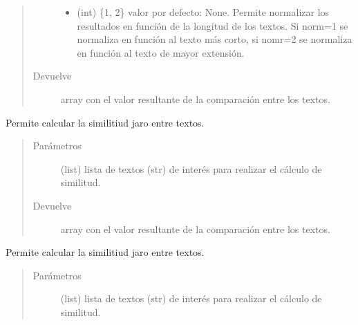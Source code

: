 \documentclass[letterpaper,10pt,openany,spanish]{sphinxmanual}
\begin{document}
\begin{fulllineitems}
\begin{fulllineitems}
\begin{quote}
\begin{description}
\begin{itemize}
\item {} 
 \textendash{} (int) \{1, 2\} valor por defecto: None. Permite normalizar 
los resultados en función de la longitud de los textos. 
Si norm=1 se normaliza en función al texto más corto, 
si nomr=2 se normaliza en función al texto de mayor extensión.

\end{itemize}

\item[{Devuelve}] \leavevmode
array con el valor resultante de la comparación entre los 
textos.

\end{description}\end{quote}

\end{fulllineitems}


\begin{fulllineitems}
\label{\detokenize{funciones/comparacion:comparacion.DiferenciaStrings.similitud_jaro}}
Permite calcular la similitiud jaro entre textos.
\begin{quote}\begin{description}
\item[{Parámetros}] \leavevmode
{} \textendash{} (list) lista de textos (str) de interés para realizar 
el cálculo de similitud.

\item[{Devuelve}] \leavevmode
array con el valor resultante de la comparación entre los 
textos.

\end{description}\end{quote}

\end{fulllineitems}


\begin{fulllineitems}
\label{\detokenize{funciones/comparacion:comparacion.DiferenciaStrings.similitud_jaro_winkler}}
Permite calcular la similitiud jaro entre textos.
\begin{quote}\begin{description}
\item[{Parámetros}] \leavevmode
{} \textendash{} (list) lista de textos (str) de interés para realizar 
el cálculo de similitud.


\end{description}
\end{quote}
\end{fulllineitems}
\end{fulllineitems}
\end{document}
